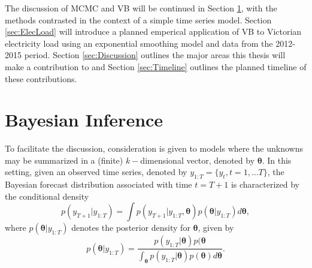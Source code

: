 \documentclass[12pt,a4paper]{article}%
\numberwithin{equation}{section}
\begin{document}
The discussion of MCMC and VB will be continued in Section \ref{sec:BayesInf}, with the methods contrasted in the context of a simple time series model. Section \ref{sec:ElecLoad} will introduce a planned emperical application of VB to Victorian electricity load using an exponential smoothing model and data from the 2012-2015 period. Section \ref{sec:Discussion} outlines the major areas this thesis will make a contribution to and Section \ref{sec:Timeline} outlines the planned timeline of these contributions.

\section{Bayesian Inference} \label{sec:BayesInf}

To facilitate the discussion, consideration is given to models where the unknowns may be summarized in a (finite) $k-$dimensional vector, denoted by $\boldsymbol{\theta}.$ In this setting, given an observed time series, denoted by $y_{1:T}= \{y_{t}, t = 1, \dots T\}$, the Bayesian forecast distribution associated with time $t=T+1$ is characterized by the conditional density
\begin{equation}
\label{predictive}
p(y_{T+1} | y_{1:T}) =\int p(y_{T+1}|y_{1:T},\boldsymbol{\theta}) p(\boldsymbol{\theta}|y_{1:T}) d\boldsymbol{\theta},
\end{equation}
where $p(\boldsymbol{\theta}|y_{1:T})$ denotes the posterior density for $\boldsymbol{\theta}$, given by
\begin{equation}
\label{posterior}
 p(\boldsymbol{\theta} | y_{1:T}) = \frac{p(y_{1:T}|\boldsymbol{\theta})p(\boldsymbol{\theta}}{\int_{\boldsymbol{\theta}}p(y_{1:T}|\boldsymbol{\theta})p(\boldsymbol{\theta}) d\boldsymbol{\theta}}.
\end{equation}
\end{document}
